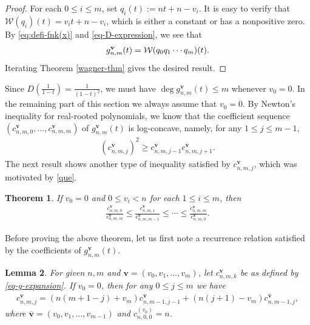 \documentclass[12pt]{article}
\newtheorem{thm}{Theorem}[section]
\newtheorem{lem}[thm]{Lemma}
\numberwithin{equation}{section}
\begin{document}
\begin{proof}
For each $0\le i\le m$, set $q_i(t):=nt+n-v_i$.
It is easy to verify that $\mathcal{W}(q_i)(t)=v_it+n-v_i$, which is either a constant or has a nonpositive zero. 
By \eqref{eq:defi-fnk(x)} and \eqref{eq-D-expression}, we see that 
\begin{align*}
g^{\bf{v}}_{n,m}(t)=\mathcal{W}(q_0q_1\cdots q_m)(t).
\end{align*}
Iterating  Theorem \ref{wagner-thm} gives the desired result. 
\end{proof}
Since $D\left(\frac{1}{1-t}\right)=\frac{1}{(1-t)^2}$, we must have $\deg g^{\mathbf v}_{n,m}(t)\le m$ whenever $v_0=0$.
In the remaining part of this section we always assume that $v_0=0$. 
By Newton's inequality for real-rooted polynomials, we know that  
the coefficient sequence $(c^{\mathbf{v}}_{n,m,0},\ldots,c^{\mathbf{v}}_{n,m,m})$ of $g^{\mathbf{v}}_{n,m}(t)$
is log-concave, namely, for any $1\leq j\leq m-1$, 
\begin{align}\label{eq-lc-coeff-gnmv}
(c^{\mathbf{v}}_{n,m,j})^2\geq c^{\mathbf{v}}_{n,m,j-1}c^{\mathbf{v}}_{n,m,j+1}.
\end{align}
The next result shows another type of inequality satisfied by $c^{\mathbf{v}}_{n,m,j}$, which was motivated by \eqref{que}.
\begin{thm}\label{thm-main-inequality} 
If $v_0=0$ and $0\le v_i<n$ for each $1\leq i\leq m$, then 
    \begin{align}\label{conj-1-inq-A}
        \frac{c^{\mathbf{v}}_{n,m,0}}{c^{\mathbf{v}}_{n,m,m}}\le\frac{c^{\mathbf{v}}_{n,m,1}}{c^{\mathbf{v}}_{n,m,m-1}}\le\cdots\le\frac{c^{\mathbf{v}}_{n,m,m}}{c^{\mathbf{v}}_{n,m,0}}.
    \end{align}
\end{thm}

Before proving the above theorem, let us first note a recurrence relation satisfied by the coefficients of $g^{\mathbf{v}}_{n,m}(t)$.
\begin{lem}\label{lem-recursion}
For given $n,m$ and $\mathbf v=(v_0,v_1,\ldots,v_m)$, let $c^{\mathbf{v}}_{n,m,k}$ be as defined by \eqref{eq-g-expansion}. 
If $v_0=0$, then for any $0\le j \le m$ we have 
\begin{align}\label{eq:rec-cki}
 c^{\mathbf{v}}_{n,m,j}=(n(m+1-j)+v_m)c^{\overline{\mathbf{v}}}_{n,m-1,j-1}+(n(j+1)-v_m)c^{\overline{\mathbf{v}}}_{n,m-1,j},
\end{align}
where $\overline{\mathbf{v}}=(v_0,v_1,\ldots,v_{m-1})$ and $c^{(v_0)}_{n,0,0}=n$.
\end{lem}
\end{document}
